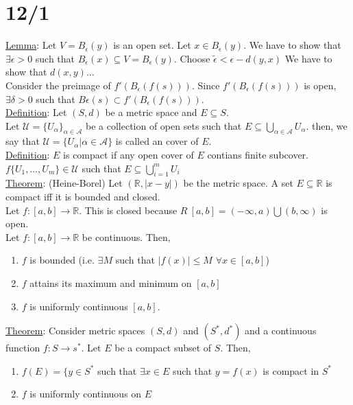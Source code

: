 \documentclass[11pt]{article}
\begin{document}
\section*{12/1}
	\underline{Lemma}: Let $V = B_{\epsilon}(y)$ is an open set. Let $x \in 
	B_{\epsilon}(y)$. We have to show that $\exists \epsilon > 0$ such that
	$B_{\epsilon}(x) \subseteq V = B_{\epsilon}(y)$. Choose $\tilde{\epsilon} <
	\epsilon - d(y,x)$ We have to show that $d(x,y) \ldots$\\
	Consider the preimage of $f'(B_{\epsilon}(f(s)))$. Since $f'(B_{\epsilon}(
	f(s)))$ is open, $\exists \delta > 0$ such that $B{\epsilon}(s) \subset 
	f'(B_{\epsilon}(f(s)))$.\\
	\underline{Definition}: Let $(S,d)$ be a metric space and $E \subseteq S$.\\
	Let $\mathcal{U} = \{ U_{\alpha}\}_{\alpha \in \mathcal{A}}$ be a collection
	of open sets such that $E \subseteq \bigcup_{\alpha \in \mathcal{A}}
	U_{\alpha}$. then, we say that $\mathcal{U} = \{ U_{\alpha} | \alpha \in 
	\mathcal{A} \}$ is called an cover of $E$.\\
	\underline{Definition}: $E$ is compact if any open cover of $E$ contians 
	finite subcover.\\
	$f\{ U_1, \ldots, U_m \} \in \mathcal{U}$ such that $E \subseteq 
	\bigcup_{i = 1}^m U_i$\\
	\underline{Theorem}: (Heine-Borel) Let $(\mathbb{R}, |x - y|)$ be the metric
	space. A set $E \subseteq \mathbb{R}$ is compact iff it is bounded and 
	closed.\\
	Let $f : [a, b] \to \mathbb{R}$. This is closed because $R \ [a,b] = 
	(-\infty, a) \bigcup (b, \infty)$ is open. \\
	Let $f: [a,b] \to \mathbb{R}$ be continuous. Then,
	\begin{enumerate}
		\item $f$ is bounded (i.e. $\exists M$ such that $|f(x)| \le M$ $\forall
		x \in [a, b]$)
		\item $f$ attains its maximum and minimum on $[a,b]$
		\item $f$ is uniformly continuous $[a,b]$. 
	\end{enumerate}
	\underline{Theorem}: Consider metric spaces $(S,d)$ and $(S^*, d^*)$ and
	a continuous function $f: S \to s^*$. Let $E$ be a compact subset of $S$.
	Then, 
	\begin{enumerate}
		\item $f(E) = \{ y \in S^*$ such that $\exists x \in E$ such that $y = 
		f(x)$ is compact in $S^*$
		\item $f$ is uniformly continuous on $E$
	\end{enumerate}
\end{document}
